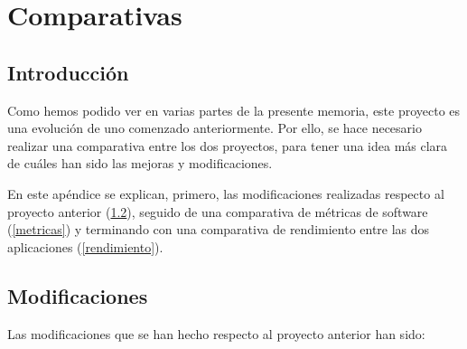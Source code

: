 \chapter{Comparativas}

\section{Introducción}
Como hemos podido ver en varias partes de la presente memoria, este proyecto es una evolución de uno comenzado anteriormente. Por ello, se hace necesario realizar una comparativa entre los dos proyectos, para tener una idea más clara de cuáles han sido las mejoras y modificaciones.

En este apéndice se explican, primero, las modificaciones realizadas respecto al proyecto anterior (\ref{modificaciones}), seguido de una comparativa de métricas de software (\ref{metricas}) y terminando con una comparativa de rendimiento entre las dos aplicaciones (\ref{rendimiento}).

\section{Modificaciones}\label{modificaciones}
Las modificaciones que se han hecho respecto al proyecto anterior han sido:

